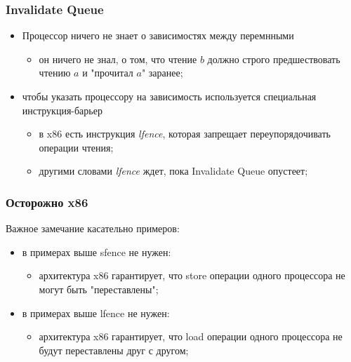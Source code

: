 \begin{frame}
\frametitle{Invalidate Queue}

\begin{itemize}
  \item Процессор ничего не знает о зависимостях между перемнными
        \begin{itemize}
          \item он ничего не знал, о том, что чтение $b$ должно строго
                предшествовать чтению $a$ и "прочитал $a$" заранее;
        \end{itemize}
  \item чтобы указать процессору на зависимость используется специальная
        инструкция-барьер
        \begin{itemize}
          \item в x86 есть инструкция \emph{lfence}, которая запрещает
                переупорядочивать операции чтения;
          \item другими словами \emph{lfence} ждет, пока Invalidate Queue
                опустеет;
        \end{itemize}
\end{itemize}
\end{frame}

\begin{frame}
\frametitle{Осторожно x86}

Важное замечание касательно примеров:
\begin{itemize}
  \item в примерах выше sfence не нужен:
        \begin{itemize}
          \item архитектура x86 гарантирует, что store операции одного
                процессора не могут быть "переставлены";
        \end{itemize}
  \item в примерах выше lfence не нужен:
        \begin{itemize}
          \item архитектура x86 гарантирует, что load операции одного
                процессора не будут переставлены друг с другом;
        \end{itemize}
\end{itemize}
\end{frame}
